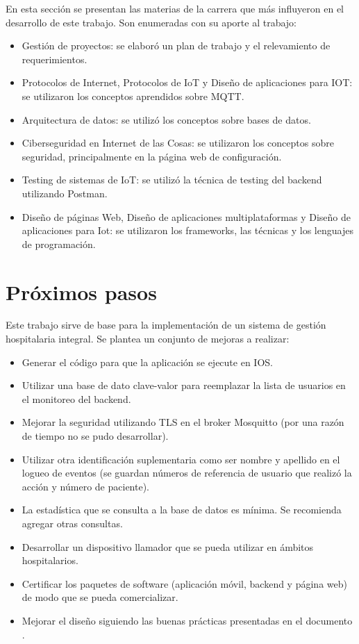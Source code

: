 En esta sección se presentan las materias de la carrera que más influyeron en el desarrollo de este trabajo. Son enumeradas con su aporte al trabajo:

\begin{itemize}
\item Gestión de proyectos: se elaboró un plan de trabajo y el relevamiento de requerimientos.
\item Protocolos de Internet, Protocolos de IoT y Diseño de aplicaciones para IOT: se utilizaron los conceptos aprendidos sobre MQTT.
\item Arquitectura de datos: se utilizó los conceptos sobre bases de datos.
\item Ciberseguridad en Internet de las Cosas: se utilizaron los conceptos sobre seguridad, principalmente en la página web de configuración.
\item Testing de sistemas de IoT: se utilizó la técnica de testing del backend utilizando Postman.
\item Diseño de páginas Web, Diseño de aplicaciones multiplataformas y Diseño de aplicaciones para Iot: se utilizaron los frameworks, las técnicas y los lenguajes de programación.
\end{itemize}

\section{Próximos pasos}


Este trabajo sirve de base para la implementación de un sistema de gestión hospitalaria integral. Se plantea un conjunto de mejoras a realizar:

\begin{itemize}
\item Generar el código para que la aplicación se ejecute en IOS.
\item Utilizar una base de dato clave-valor para reemplazar la lista de usuarios en el monitoreo del backend.
\item Mejorar la seguridad utilizando TLS en el broker Mosquitto (por una razón de tiempo no se pudo desarrollar).
\item Utilizar otra identificación suplementaria como ser nombre y apellido en el logueo de eventos (se guardan números de referencia de usuario que realizó la acción y número de paciente). 
\item La estadística que se consulta a la base de datos es mínima. Se recomienda agregar otras consultas.
\item Desarrollar un dispositivo llamador que se pueda utilizar en ámbitos hospitalarios.
\item Certificar los paquetes de software (aplicación móvil, backend y página web) de modo que se pueda comercializar.
\item Mejorar el diseño siguiendo las buenas prácticas presentadas en el documento \citep{BOOK:3}.

\end{itemize}
